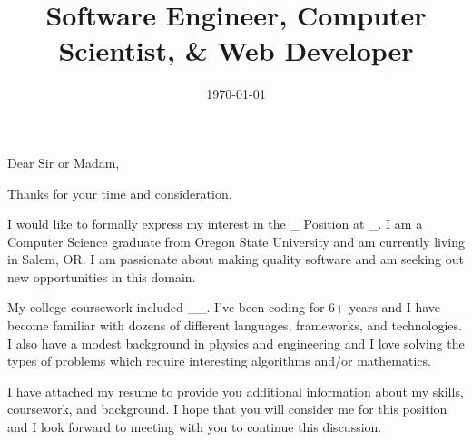 \documentclass[11pt,a4paper,sans]{moderncv}
\title{Software Engineer, Computer Scientist, \& Web Developer}
\begin{document}
\date{\today} %
\opening{Dear Sir or Madam,} %
\closing{Thanks for your time and consideration,} %

\makelettertitle

I would like to formally express my interest in the _ Position at _. I am a Computer Science graduate from Oregon State University and am currently living in Salem, OR. I am passionate about making quality software and am seeking out new opportunities in this domain. 

My college coursework included __. I've been coding for 6+ years and I have become familiar with dozens of different languages, frameworks, and technologies. I also have a modest background in physics and engineering and I love solving the types of problems which require interesting algorithms and/or mathematics. 

I have attached my resume to provide you additional information about my skills, coursework, and background. I hope that you will consider me for this position and I look forward to meeting with you to continue this discussion.

\makeletterclosing 
\end{document}
